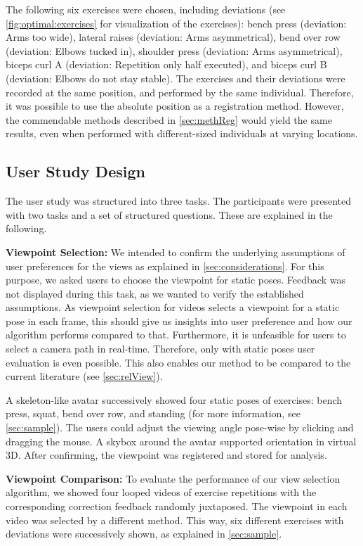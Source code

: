 The following six exercises were chosen, including deviations (see \autoref{fig:optimal:exercises} for visualization of the exercises): bench press (deviation: Arms too wide), lateral raises (deviation: Arms asymmetrical), bend over row (deviation: Elbows tucked in), shoulder press (deviation: Arms asymmetrical), biceps curl A (deviation: Repetition only half executed), and biceps curl B (deviation: Elbows do not stay stable). The exercises and their deviations were recorded at the same position, and performed by the same individual. Therefore, it was possible to use the absolute position as a registration method. However, the commendable methods described in \autoref{sec:methReg} would yield the same results, even when performed with different-sized individuals at varying locations.

\subsection{User Study Design \label{sec:study}}
The user study was structured into three tasks. The participants were presented with two tasks and a set of structured questions. These are explained in the following.

\textbf{Viewpoint Selection:} We intended to confirm the underlying assumptions of user preferences for the views as explained in \autoref{sec:considerations}. For this purpose, we asked users to choose the viewpoint for static poses. Feedback was not displayed during this task, as we wanted to verify the established assumptions. As viewpoint selection for videos selects a viewpoint for a static pose in each frame, this should give us insights into user preference and how our algorithm performs compared to that. Furthermore, it is unfeasible for users to select a camera path in real-time. Therefore, only with static poses user evaluation is even possible. This also enables our method to be compared to the current literature (see \autoref{sec:relView}).

A skeleton-like avatar successively showed four static poses of exercises: bench press, squat, bend over row, and standing (for more information, see \autoref{sec:sample}). The users could adjust the viewing angle pose-wise by clicking and dragging the mouse. A skybox around the avatar supported orientation in virtual 3D. After confirming, the viewpoint was registered and stored for analysis.

\textbf{Viewpoint Comparison:} To evaluate the performance of our view selection algorithm, we showed four looped videos of exercise repetitions with the corresponding correction feedback randomly juxtaposed. The viewpoint in each video was selected by a different method. This way, six different exercises with deviations were successively shown, as explained in \autoref{sec:sample}.  

